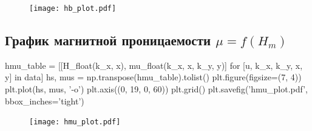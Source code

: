 \documentclass[12pt, a4paper]{article}
\begin{document}
\begin{figure}[H]
\texttt{[image: hb\_plot.pdf]}
\end{figure}

\subsection*{График магнитной проницаемости $\mu = f(H_m)$}

\begin{pycode}
hmu_table = [[H_float(k_x, x), mu_float(k_x, x, k_y, y)]
  for [u, k_x, k_y, x, y] in data]
hs, mus = np.transpose(hmu_table).tolist()
plt.figure(figsize=(7, 4))
plt.plot(hs, mus, '-o')
plt.axis((0, 19, 0, 60))
plt.grid()
plt.savefig('hmu_plot.pdf', bbox_inches='tight')
\end{pycode}

\begin{figure}[H]
\texttt{[image: hmu\_plot.pdf]}
\end{figure}
\end{document}

